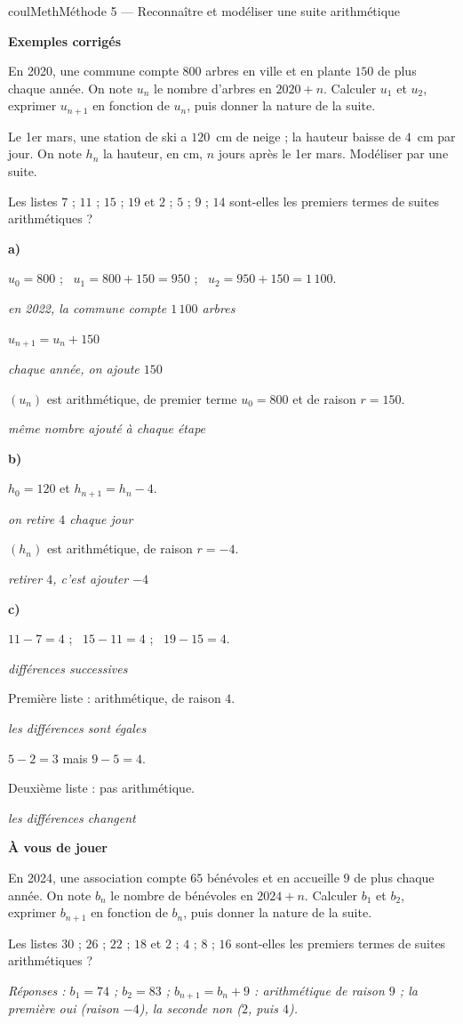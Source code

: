 \documentclass[11pt,a4paper]{article}
\makeatletter
\newcounter{lycee@signet}
\newcommand{\signet}[3][]{\stepcounter{lycee@signet}%
  \edef\lycee@dest{\if\relax\detokenize{#1}\relax
    signet.\arabic{lycee@signet}\else#1\fi}%
  \hypertarget{\lycee@dest}{}\bookmark[level=#2,dest=\lycee@dest]{#3}}
\def\textsuperscript#1{#1}\def\dfrac#1#2{#1/#2}\def\frac#1#2{#1/#2}%
\newcommand{\res}[1]{#1}
\newcounter{methode}
\newenvironment{methodebox}[1][Méthode]{\stepcounter{methode}%
  \begin{boitecours}[phantom={\signet[methode-\arabic{methode}]{2}{#1}}]{coulMeth}{#1}}%
  {\end{boitecours}}
\newcommand{\etape}[1]{\par\smallskip\textbf{\color{coulMeth}#1}\par\nobreak\smallskip}
\newcommand{\reponse}[1]{\par\smallskip
  {\footnotesize\itshape\color{black!55}Réponses : #1}}
\newcommand{\explique}[2]{\par\smallskip\noindent
  \begin{minipage}[t]{0.57\linewidth}\raggedright #1\end{minipage}\hfill
  \begin{minipage}[t]{0.40\linewidth}\raggedright\leavevmode
    {\small\itshape\color{black!60}#2}\end{minipage}\par}
\newcommand{\cas}[1]{\par\smallskip\noindent\textbf{\color{coulExo}#1}\vadjust{\nobreak}}
\newenvironment{correction}{\par}{\par}
\newcommand{\etapeexemples}{\etape{Exemples corrigés}}
\makeatother
\begin{document}
\begin{methodebox}[Méthode 5 --- Reconnaître et modéliser une suite arithmétique]
\etapeexemples
\begin{questions}[label=\alph*)]
  \item En 2020, une commune compte $800$ arbres en ville et en plante $150$ de plus
        chaque année. On note $u_{n}$ le nombre d'arbres en $2020+n$. Calculer $u_{1}$
        et $u_{2}$, exprimer $u_{n+1}$ en fonction de $u_{n}$, puis donner la nature de
        la suite.
  \item Le 1\textsuperscript{er} mars, une station de ski a $120$~cm de neige ; la
        hauteur baisse de $4$~cm par jour. On note $h_{n}$ la hauteur, en cm, $n$ jours
        après le 1\textsuperscript{er} mars. Modéliser par une suite.
  \item Les listes $7$ ; $11$ ; $15$ ; $19$ \;et\; $2$ ; $5$ ; $9$ ; $14$ sont-elles
        les premiers termes de suites arithmétiques ?
\end{questions}
\begin{correction}
\cas{a)}
\explique{$u_{0}=800$ ; \ $u_{1}=800+150=\res{950}$ ; \ $u_{2}=950+150=\res{1\,100}$.}{en 2022,
la commune compte $1\,100$ arbres}
\explique{$u_{n+1}=\res{u_{n}+150}$}{chaque année, on ajoute $150$}
\explique{$(u_{n})$ est \res{arithmétique, de premier terme $u_{0}=800$ et de raison
$r=150$}.}{même nombre ajouté à chaque étape}
\cas{b)}
\explique{\res{$h_{0}=120$ et $h_{n+1}=h_{n}-4$}.}{on retire $4$ chaque jour}
\explique{$(h_{n})$ est \res{arithmétique, de raison $r=-4$}.}{retirer $4$, c'est ajouter
$-4$}
\cas{c)}
\explique{$11-7=4$ ; \ $15-11=4$ ; \ $19-15=4$.}{différences successives}
\explique{Première liste : \res{arithmétique, de raison $4$}.}{les différences sont égales}
\explique{$5-2=3$ mais $9-5=4$.}{}
\explique{Deuxième liste : \res{pas arithmétique}.}{les différences changent}
\end{correction}

\etape{À vous de jouer}
\begin{questions}
  \item En 2024, une association compte $65$ bénévoles et en accueille $9$ de plus
        chaque année. On note $b_{n}$ le nombre de bénévoles en $2024+n$. Calculer $b_{1}$
        et $b_{2}$, exprimer $b_{n+1}$ en fonction de $b_{n}$, puis donner la nature de
        la suite.
  \item Les listes $30$ ; $26$ ; $22$ ; $18$ \;et\; $2$ ; $4$ ; $8$ ; $16$ sont-elles
        les premiers termes de suites arithmétiques ?
\end{questions}
\reponse{$b_{1}=74$ ; $b_{2}=83$ ; $b_{n+1}=b_{n}+9$ : arithmétique de raison $9$ ;\; la première oui (raison
$-4$), la seconde non ($2$, puis $4$).}
\end{methodebox}
\end{document}
